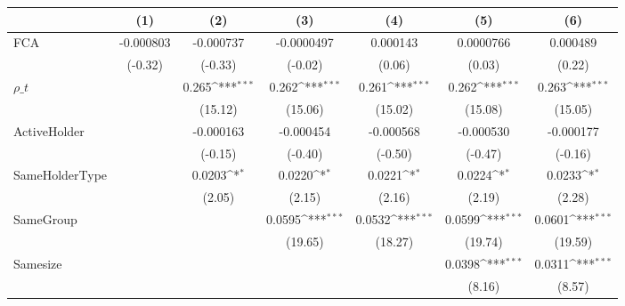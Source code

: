 {
\def\sym#1{\ifmmode^{#1}\else\(^{#1}\)\fi}
\begin{tabular}{l*{6}{c}}
\hline\hline
                    &\multicolumn{1}{c}{(1)}         &\multicolumn{1}{c}{(2)}         &\multicolumn{1}{c}{(3)}         &\multicolumn{1}{c}{(4)}         &\multicolumn{1}{c}{(5)}         &\multicolumn{1}{c}{(6)}         \\
\hline
 FCA                &   -0.000803         &   -0.000737         &  -0.0000497         &    0.000143         &   0.0000766         &    0.000489         \\
                    &     (-0.32)         &     (-0.33)         &     (-0.02)         &      (0.06)         &      (0.03)         &      (0.22)         \\
[1em]
$ \rho\_t $          &                     &       0.265\sym{***}&       0.262\sym{***}&       0.261\sym{***}&       0.262\sym{***}&       0.263\sym{***}\\
                    &                     &     (15.12)         &     (15.06)         &     (15.02)         &     (15.08)         &     (15.05)         \\
[1em]
ActiveHolder        &                     &   -0.000163         &   -0.000454         &   -0.000568         &   -0.000530         &   -0.000177         \\
                    &                     &     (-0.15)         &     (-0.40)         &     (-0.50)         &     (-0.47)         &     (-0.16)         \\
[1em]
SameHolderType      &                     &      0.0203\sym{*}  &      0.0220\sym{*}  &      0.0221\sym{*}  &      0.0224\sym{*}  &      0.0233\sym{*}  \\
                    &                     &      (2.05)         &      (2.15)         &      (2.16)         &      (2.19)         &      (2.28)         \\
[1em]
SameGroup           &                     &                     &      0.0595\sym{***}&      0.0532\sym{***}&      0.0599\sym{***}&      0.0601\sym{***}\\
                    &                     &                     &     (19.65)         &     (18.27)         &     (19.74)         &     (19.59)         \\
[1em]
Samesize            &                     &                     &                     &                     &      0.0398\sym{***}&      0.0311\sym{***}\\
                    &                     &                     &                     &                     &      (8.16)         &      (8.57)         \\

\end{tabular}}
